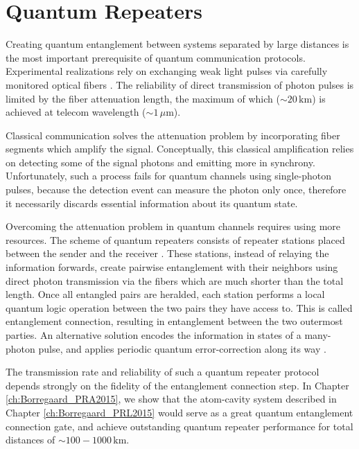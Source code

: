 \section{Quantum Repeaters}
Creating quantum entanglement between systems separated by
large distances is the most important prerequisite of quantum communication
protocols. Experimental realizations rely on exchanging weak light pulses
via carefully monitored optical fibers \cite{Peev2009}. The
reliability of direct transmission of photon pulses is limited by the
fiber attenuation length, the maximum of which ($\sim 20\,\mathrm{km}$) is
achieved at telecom wavelength ($\sim 1\,\mu\mathrm{m}$).

Classical communication solves the attenuation problem by incorporating fiber
segments which amplify the signal. Conceptually, this classical amplification
relies on detecting some of the signal photons and emitting more in synchrony.
Unfortunately, such a process fails for quantum channels using single-photon
pulses, because the detection event can measure the photon only once,
therefore it necessarily discards essential information about its quantum state.

Overcoming the attenuation problem in quantum channels requires using more
resources. The scheme of quantum repeaters consists of repeater stations placed
between the sender and the receiver \cite{bennett2, bennett, duan3}.
These stations, instead of relaying the information forwards, create pairwise
entanglement with their neighbors using direct photon transmission via the
fibers which are much shorter than the total length. Once all entangled pairs
are heralded, each station performs a local quantum logic operation between the
two pairs they have access to. This is called entanglement connection, resulting in
entanglement between the two outermost parties. An alternative solution 
encodes the information in states of a many-photon pulse, and applies periodic
quantum error-correction along its way \cite{Muralidharan2015}.

The transmission rate  and reliability of such a quantum repeater protocol
depends strongly on the fidelity of the entanglement connection step. In Chapter
\ref{ch:Borregaard_PRA2015}, we show that the atom-cavity system described
in Chapter \ref{ch:Borregaard_PRL2015} would serve as a great quantum
entanglement connection gate, and achieve outstanding quantum repeater
performance for total distances of $\sim 100-1000\,\mathrm{km}$.



